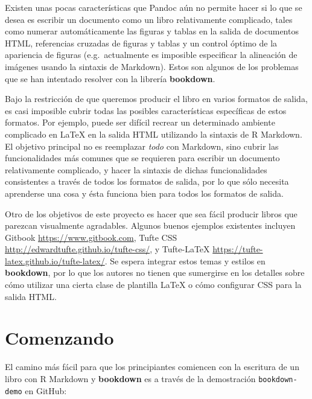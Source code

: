 \documentclass[12pt,]{krantz}
\theoremstyle{definition}
\theoremstyle{definition}
\theoremstyle{definition}
\theoremstyle{remark}
\begin{document}
Existen unas pocas características que Pandoc aún no permite hacer si lo
que se desea es escribir un documento como un libro relativamente
complicado, tales como numerar automáticamente las figuras y tablas en
la salida de documentos HTML, referencias cruzadas de figuras y tablas y
un control óptimo de la apariencia de figuras (e.g.~actualmente es
imposible especificar la alineación de imágenes usando la sintaxis de
Markdown). Estos son algunos de los problemas que se han intentado
resolver con la librería \textbf{bookdown}.

Bajo la restricción de que queremos producir el libro en varios formatos
de salida, es casi imposible cubrir todas las posibles características
específicas de estos formatos. Por ejemplo, puede ser difícil recrear un
determinado ambiente complicado en LaTeX en la salida HTML utilizando la
sintaxis de R Markdown. El objetivo principal no es reemplazar
\emph{todo} con Markdown, sino cubrir las funcionalidades más comunes
que se requieren para escribir un documento relativamente complicado, y
hacer la sintaxis de dichas funcionalidades consistentes a través de
todos los formatos de salida, por lo que sólo necesita aprenderse una
cosa y ésta funciona bien para todos los formatos de
salida.

Otro de los objetivos de este proyecto es hacer que sea fácil producir
libros que parezcan visualmente agradables. Algunos buenos ejemplos
existentes incluyen Gitbook \url{https://www.gitbook.com}, Tufte CSS
\url{http://edwardtufte.github.io/tufte-css/}, y Tufte-LaTeX
\url{https://tufte-latex.github.io/tufte-latex/}. Se espera integrar
estos temas y estilos en \textbf{bookdown}, por lo que los autores no
tienen que sumergirse en los detalles sobre cómo utilizar una cierta
clase de plantilla LaTeX o cómo configurar CSS para la salida HTML.

\section{Comenzando}\label{comenzando}

El camino más fácil para que los principiantes comiencen con la
escritura de un libro con R Markdown y \textbf{bookdown} es a través de
la demostración \texttt{bookdown-demo} en GitHub:
\end{document}
